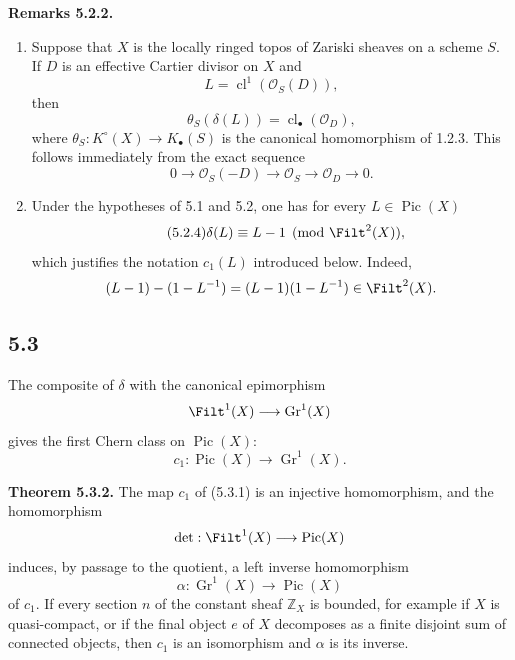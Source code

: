 \documentclass[11pt]{article}
\newcommand{\Gr}{\operatorname{Gr}}
\newcommand{\cl}{\operatorname{cl}}
\providecommand{\Pic}{\operatorname{Pic}}
\providecommand{\Gr}{\operatorname{Gr}}
\providecommand{\Gr}{\operatorname{G}}
\begin{document}
\textbf{Remarks 5.2.2.}
\begin{enumerate}[label=\alph*)]
\item Suppose that \(X\) is the locally ringed topos of Zariski sheaves on a scheme \(S\). If \(D\) is an effective Cartier divisor on \(X\) and
\[
 L=\cl^1(\mathcal O_S(D)),
\]
then
\begin{equation}\tag{5.2.3}
 \theta_S(\delta(L))=\cl_\bullet(\mathcal O_D),
\end{equation}
where \(\theta_S:K^\circ(X)\to K_\bullet(S)\) is the canonical homomorphism of 1.2.3. This follows immediately from the exact sequence
\[
 0\longrightarrow\mathcal O_S(-D)\longrightarrow\mathcal O_S\longrightarrow\mathcal O_D\longrightarrow0.
\]

\item Under the hypotheses of 5.1 and 5.2, one has for every \(L\in\Pic(X)\)
\begin{equation}\tag{5.2.4}
 \delta(L)\equiv L-1\pmod{\Filt^2(X)},
\end{equation}
which justifies the notation \(c_1(L)\) introduced below. Indeed,
\[
 (L-1)-(1-L^{-1})=(L-1)(1-L^{-1})\in\Filt^2(X).
\]
\end{enumerate}

\subsection*{5.3}
The composite of \(\delta\) with the canonical epimorphism
\[
 \Filt^1(X)\longrightarrow\Gr^1(X)
\]
gives the first Chern class on \(\Pic(X)\):
\begin{equation}\tag{5.3.1}
 c_1:\Pic(X)\longrightarrow\Gr^1(X).
\end{equation}

\textbf{Theorem 5.3.2.} The map \(c_1\) of (5.3.1) is an injective homomorphism, and the homomorphism
\[
 \det:\Filt^1(X)\longrightarrow\Pic(X)
\]
induces, by passage to the quotient, a left inverse homomorphism
\[
 \alpha:\Gr^1(X)\longrightarrow\Pic(X)
\]
of \(c_1\). If every section \(n\) of the constant sheaf \(\mathbb Z_X\) is bounded, for example if \(X\) is quasi-compact, or if the final object \(e\) of \(X\) decomposes as a finite disjoint sum of connected objects, then \(c_1\) is an isomorphism and \(\alpha\) is its inverse.
\end{document}
